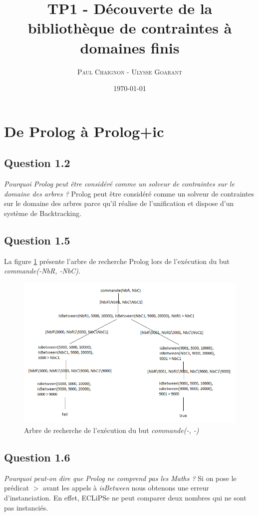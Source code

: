 \documentclass[a4paper,12pt]{article}
\title{TP1 - Découverte de la bibliothèque de contraintes à domaines finis}
\author{\textsc{Paul Chaignon} - \textsc{Ulysse Goarant}}
\date{\today}
\begin{document}
\maketitle

\section{De Prolog à Prolog+ic}


\vspace{2cm}

\subsection*{Question 1.2}
\textit{Pourquoi Prolog peut être considéré comme un solveur de contraintes sur le domaine des arbres ?}
Prolog peut être considéré comme un solveur de contraintes sur le domaine des arbres parce qu'il réalise de l'unification et dispose d'un système de Backtracking.

\subsection*{Question 1.5}
La figure \ref{fig:searchtree-commande} présente l'arbre de recherche Prolog lors de l'exécution du but \textit{commande(-NbR, -NbC)}.
\begin{figure}
  \center
  \includegraphics[width=1\textwidth]{searchtree-commande.png}
  \caption{Arbre de recherche de l'exécution du but \textit{commande(-, -)}}
  \label{fig:searchtree-commande}
\end{figure}

\subsection*{Question 1.6}
\textit{Pourquoi peut-on dire que Prolog ne comprend pas les Maths ?}
Si on pose le prédicat $>$ avant les appels à \textit{isBetween} nous obtenons une erreur d'instanciation.
En effet, ECLiPSe ne peut comparer deux nombres qui ne sont pas instanciés.
\end{document}
